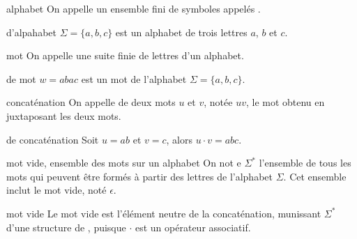 \begin{definition}{}{alphabet}
    On appelle  un ensemble fini de symboles appelés .
\end{definition}

\begin{exemple}{}{d'alpahabet}
    $\Sigma = \{a, b, c\}$ est un alphabet de trois lettres $a$, $b$ et $c$.
\end{exemple}

\begin{definition}{}{mot}
    On appelle  une suite finie de lettres d'un alphabet.
\end{definition}

\begin{exemple}{}{de mot}
    $w = abac$ est un mot de l'alphabet $\Sigma = \{a, b, c\}$.
\end{exemple}

\begin{definition}{}{concaténation}
    On appelle  de deux mots $u$ et $v$, notée $uv$, le mot obtenu en juxtaposant les deux mots.
\end{definition}

\begin{exemple}{}{de concaténation}
    Soit $u = ab$ et $v = c$, alors $u\cdot v = abc$.
\end{exemple}

\begin{definition}{}{mot vide, ensemble des mots sur un alphabet}
    On not e $\Sigma^*$ l'ensemble de tous les mots qui peuvent être formés à partir des lettres de l'alphabet $\Sigma$. Cet ensemble inclut le mot vide, noté $\epsilon$.
\end{definition}

\begin{remarque}{}{mot vide}
    Le mot vide est l'élément neutre de la concaténation, munissant $\Sigma^*$ d'une structure de , puisque $\cdot$ est un opérateur associatif.
\end{remarque}